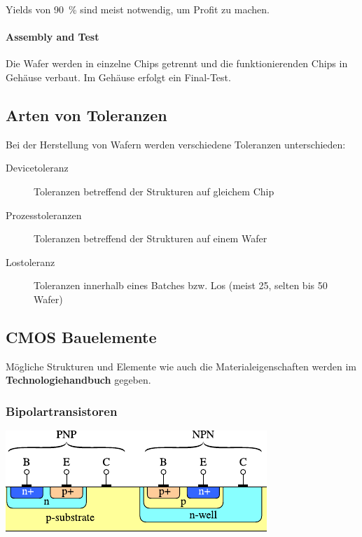 Yields von \qty{90}{\percent} sind meist notwendig, um Profit zu machen.

\paragraph{Assembly and Test}
Die Wafer werden in einzelne Chips getrennt und die funktionierenden Chips in Gehäuse verbaut. Im Gehäuse erfolgt ein Final-Test.


\subsection{Arten von Toleranzen}
Bei der Herstellung von Wafern werden verschiedene Toleranzen unterschieden:
\begin{description}
    \item[Devicetoleranz] Toleranzen betreffend der Strukturen auf gleichem Chip
    \item[Prozesstoleranzen] Toleranzen betreffend der Strukturen auf einem Wafer
    \item[Lostoleranz] Toleranzen innerhalb eines Batches bzw. Los (meist 25, selten bis 50 Wafer)
\end{description}

\subsection{CMOS Bauelemente}
Mögliche Strukturen und Elemente wie auch die Materialeigenschaften werden im \textbf{Technologiehandbuch} gegeben.

%     

%     

\subsubsection{Bipolartransistoren}
\begin{center}
    \includegraphics[width=0.5\columnwidth, align=t]{images/01_BJT.pdf}
\end{center}


